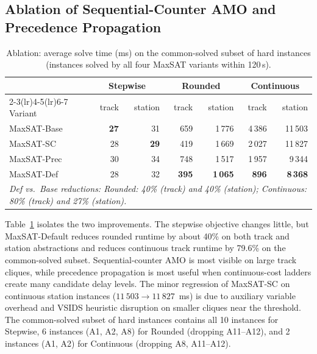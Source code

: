 \documentclass[runningheads]{llncs}
\begin{document}
\subsection{Ablation of Sequential-Counter AMO and Precedence Propagation}
\label{subsec:results-ablation}

\begin{table}
\centering
\caption{Ablation: average solve time (ms) on the common-solved subset of hard instances (instances solved by all four MaxSAT variants within 120\,s).}
\label{tab:ablation-runtime}
\scriptsize
\setlength{\tabcolsep}{4.5pt}
\renewcommand{\arraystretch}{1.0}
\begin{tabular}{lrrrrrr}
\toprule
& \multicolumn{2}{c}{Stepwise} & \multicolumn{2}{c}{Rounded} & \multicolumn{2}{c}{Continuous} \\
\cmidrule(lr){2-3}\cmidrule(lr){4-5}\cmidrule(lr){6-7}
Variant & track & station & track & station & track & station \\
\midrule
MaxSAT-Base & \textbf{27} & 31 & 659 & 1\,776 & 4\,386 & 11\,503 \\
MaxSAT-SC & 28 & \textbf{29} & 419 & 1\,669 & 2\,027 & 11\,827 \\
MaxSAT-Prec & 30 & 34 & 748 & 1\,517 & 1\,957 & 9\,344 \\
MaxSAT-Def & 28 & 32 & \textbf{395} & \textbf{1\,065} & \textbf{896} & \textbf{8\,368} \\
\midrule
\multicolumn{7}{p{0.95\linewidth}}{\scriptsize\emph{Def vs.\ Base reductions: Rounded: 40\% (track) and 40\% (station); Continuous: 80\% (track) and 27\% (station).}} \\
\bottomrule
\end{tabular}
\end{table}

Table~\ref{tab:ablation-runtime} isolates the two improvements. The stepwise
objective changes little, but MaxSAT-Default reduces rounded runtime by about
40\% on both track and station abstractions and reduces continuous track
runtime by 79.6\% on the common-solved subset. Sequential-counter AMO is most visible on large track
cliques, while precedence propagation is most useful when continuous-cost
ladders create many candidate delay levels. The minor regression of MaxSAT-SC on continuous station instances ($11\,503 \to 11\,827$~ms) is due to auxiliary variable overhead and VSIDS heuristic disruption on smaller cliques near the threshold. The common-solved subset of hard instances contains all 10 instances for Stepwise, 6 instances (A1, A2, A8) for Rounded (dropping A11--A12), and 2 instances (A1, A2) for Continuous (dropping A8, A11--A12).
\end{document}
